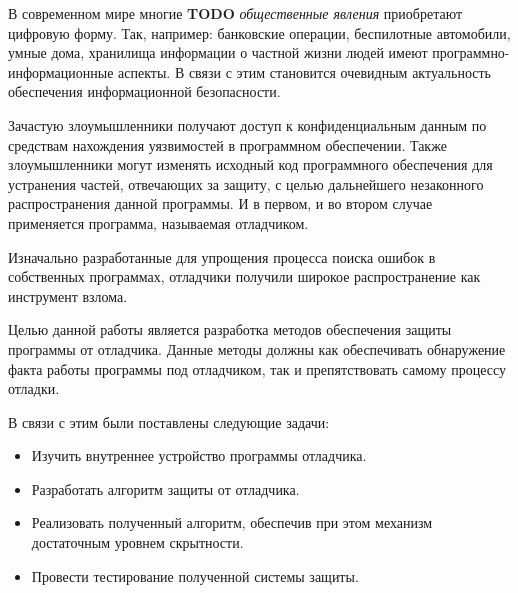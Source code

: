 
В современном мире многие \textbf{TODO} \textit{общественные явления}
приобретают цифровую форму. Так, например: банковские операции, беспилотные
автомобили, умные дома, хранилища информации о частной жизни людей имеют
программно-информационные аспекты. В связи с этим становится очевидным
актуальность обеспечения информационной безопасности. 

Зачастую злоумышленники получают доступ к конфиденциальным данным по средствам
нахождения уязвимостей в программном обеспечении. Также злоумышленники могут
изменять исходный код программного обеспечения для устранения частей, отвечающих
за защиту, с целью дальнейшего незаконного распространения данной программы. И в
первом, и во втором случае применяется программа, называемая отладчиком. 

Изначально разработанные для упрощения процесса поиска ошибок в собственных
программах, отладчики получили широкое распространение как инструмент взлома. 

Целью данной работы является разработка методов обеспечения защиты программы от
отладчика. Данные методы должны как обеспечивать обнаружение факта работы
программы под отладчиком, так и препятствовать самому процессу отладки.

В связи с этим были поставлены следующие задачи:
\begin{itemize}
  \item Изучить внутреннее устройство программы отладчика.
  \item Разработать алгоритм защиты от отладчика.
  \item Реализовать полученный алгоритм, обеспечив при этом механизм достаточным
    уровнем скрытности.
  \item Провести тестирование полученной системы защиты.
\end{itemize}

